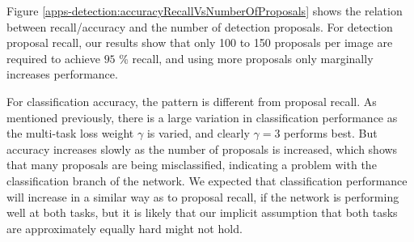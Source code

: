 Figure \ref{apps-detection:accuracyRecallVsNumberOfProposals} shows the relation between recall/accuracy and the number of detection proposals. For detection proposal recall, our results show that only 100 to 150 proposals per image are required to achieve $95$ \% recall, and using more proposals only marginally increases performance.

For classification accuracy, the pattern is different from proposal recall. As mentioned previously, there is a large variation in classification performance as the multi-task loss weight $\gamma$ is varied, and clearly $\gamma = 3$ performs best. But accuracy increases slowly as the number of proposals is increased, which shows that many proposals are being misclassified, indicating a problem with the classification branch of the network. We expected that classification performance will increase in a similar way as to proposal recall, if the network is performing well at both tasks, but it is likely that our implicit assumption that both tasks are approximately equally hard might not hold.

